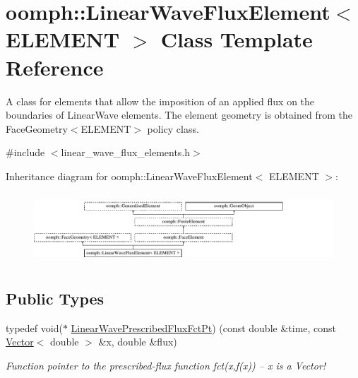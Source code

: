 \hypertarget{classoomph_1_1LinearWaveFluxElement}{}\section{oomph\+:\+:Linear\+Wave\+Flux\+Element$<$ E\+L\+E\+M\+E\+NT $>$ Class Template Reference}
\label{classoomph_1_1LinearWaveFluxElement}


A class for elements that allow the imposition of an applied flux on the boundaries of Linear\+Wave elements. The element geometry is obtained from the Face\+Geometry$<$\+E\+L\+E\+M\+E\+N\+T$>$ policy class.  




{\ttfamily \#include $<$linear\+\_\+wave\+\_\+flux\+\_\+elements.\+h$>$}

Inheritance diagram for oomph\+:\+:Linear\+Wave\+Flux\+Element$<$ E\+L\+E\+M\+E\+NT $>$\+:\begin{figure}[H]
\begin{center}
\leavevmode
\includegraphics[height=2.657177cm]{classoomph_1_1LinearWaveFluxElement}
\end{center}
\end{figure}
\subsection*{Public Types}
\begin{DoxyCompactItemize}
\item 
typedef void($\ast$ \hyperlink{classoomph_1_1LinearWaveFluxElement_a4010abac8856733ae2b152bc41e7b558}{Linear\+Wave\+Prescribed\+Flux\+Fct\+Pt}) (const double \&time, const \hyperlink{classoomph_1_1Vector}{Vector}$<$ double $>$ \&x, double \&flux)
\begin{DoxyCompactList}\small\item\em Function pointer to the prescribed-\/flux function fct(x,f(x)) -- x is a Vector! \end{DoxyCompactList}\end{DoxyCompactItemize}
